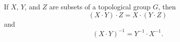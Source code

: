If $X$, $Y$, and $Z$ are subsets of a topological group $G$, then
$$(X \cdot Y) \cdot Z = X \cdot (Y \cdot Z)$$
and
$$(X \cdot Y)^{-1} = Y^{-1} \cdot X^{-1}.$$
